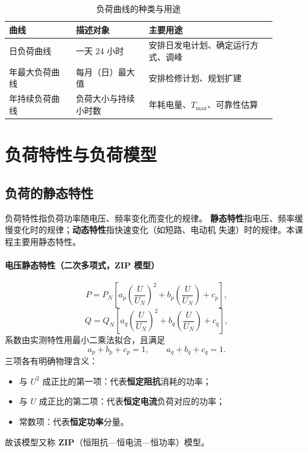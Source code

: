 \begin{table}[htbp]
  \centering
  \caption{负荷曲线的种类与用途}
  \small
  \begin{tabular}{@{}p{0.22\linewidth}p{0.24\linewidth}p{0.42\linewidth}@{}}
    \toprule
    曲线 & 描述对象 & 主要用途 \\
    \midrule
    日负荷曲线 & 一天 24 小时 & 安排日发电计划、确定运行方式、调峰 \\
    年最大负荷曲线 & 每月（日）最大值 & 安排检修计划、规划扩建 \\
    年持续负荷曲线 & 负荷大小与持续小时数 & 年耗电量、$T_{\max}$、可靠性估算 \\
    \bottomrule
  \end{tabular}
\end{table}


\section{负荷特性与负荷模型}

\subsection{负荷的静态特性}

负荷特性指负荷功率随电压、频率变化而变化的规律。
\textbf{静态特性}指电压、频率缓慢变化时的规律；\textbf{动态特性}指快速变化（如短路、电动机
失速）时的规律。本课程主要用静态特性。

\paragraph{电压静态特性（二次多项式，ZIP 模型）}
\begin{equation}
  P=P_N\left[a_p\left(\frac{U}{U_N}\right)^{2}+b_p\left(\frac{U}{U_N}\right)+c_p\right],
\end{equation}
\begin{equation}
  Q=Q_N\left[a_q\left(\frac{U}{U_N}\right)^{2}+b_q\left(\frac{U}{U_N}\right)+c_q\right],
\end{equation}
系数由实测特性用最小二乘法拟合，且满足
\begin{equation}
  a_p+b_p+c_p=1,\qquad a_q+b_q+c_q=1 .
\end{equation}
三项各有明确物理含义：
\begin{itemize}
  \item 与 $U^{2}$ 成正比的第一项：代表\textbf{恒定阻抗}消耗的功率；
  \item 与 $U$ 成正比的第二项：代表\textbf{恒定电流}负荷对应的功率；
  \item 常数项：代表\textbf{恒定功率}分量。
\end{itemize}
故该模型又称 \textbf{ZIP}（恒阻抗—恒电流—恒功率）模型。

